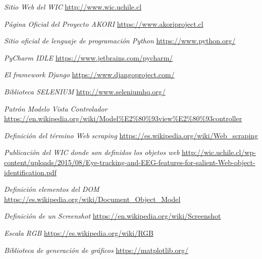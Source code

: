\newpage %
\begin{references}
	\textit{Sitio Web del WIC}
	\url{http://www.wic.uchile.cl}
	
	\textit{Página Oficial del Proyecto AKORI} 
	\url{https://www.akoriproject.cl}
	
	\textit{Sitio oficial de lenguaje de programación \textit{Python}}
	\url{https://www.python.org/}
	
	\textit{PyCharm IDLE}
	\url{https://www.jetbrains.com/pycharm/}
	
	\textit{El framework \textit{Django}}
	\url{https://www.djangoproject.com/}
	
	\textit{Biblioteca SELENIUM}
	\url{http://www.seleniumhq.org/}
	
	\textit{Patrón Modelo Vista Controlador}
	\url{https://en.wikipedia.org/wiki/Model%E2%80%93view%E2%80%93controller}
	
	\textit{Definición del término Web scraping}
	\url{https://es.wikipedia.org/wiki/Web_scraping}
	
	\textit{Publicación del WIC donde son definidos los objetos web}
	\url{http://wic.uchile.cl/wp-content/uploads/2015/08/Eye-tracking-and-EEG-features-for-salient-Web-object-identification.pdf}
	
	\textit{Definición elementos del DOM}
	\url{https://es.wikipedia.org/wiki/Document_Object_Model}
	
	\textit{Definición de un Screenshot}
	\url{https://en.wikipedia.org/wiki/Screenshot}
	
	\textit{Escala RGB}
	\url{https://es.wikipedia.org/wiki/RGB}
	
	\textit{Biblioteca de generación de gráficos}
	\url{https://matplotlib.org/}
	
	
	

\end{references}
